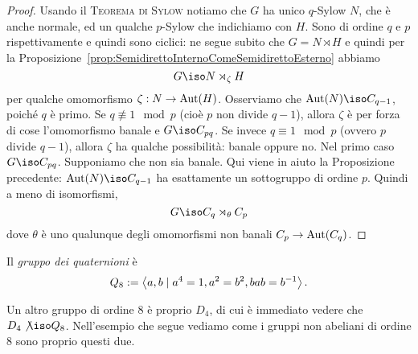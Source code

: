 \begin{proof}
Usando il {\scshape Teorema di Sylow} notiamo che $G$ ha unico $q$-Sylow $N$, che è anche normale, ed un qualche $p$-Sylow che indichiamo con $H$. Sono di ordine $q$ e $p$ rispettivamente e quindi sono ciclici: ne segue subito che $G = N \rtimes H$ e quindi per la Proposizione~\ref{prop:SemidirettoInternoComeSemidirettoEsterno} abbiamo 
\[G \iso N \rtimes_\zeta H \]
per qualche omomorfismo $\zeta : N \to \mathrm{Aut}(H)$. Osserviamo che $\Aut(N) \iso C_{q-1}$, poiché $q$ è primo. Se $q \nequiv 1 \mod p$ (cioè $p$ non divide $q-1$), allora $\zeta$ è per forza di cose l'omomorfismo banale e $G \iso C_{pq}$. Se invece $q \equiv 1 \mod p$ (ovvero $p$ divide $q-1$), allora $\zeta$ ha qualche possibilità: banale oppure no. Nel primo caso $G \iso C_{pq}$. Supponiamo che non sia banale. Qui viene in aiuto la Proposizione precedente: $\Aut(N) \iso C_{q-1}$ ha esattamente un sottogruppo di ordine $p$. Quindi a meno di isomorfismi,
\[G \iso C_q \rtimes_\theta C_p\]
dove $\theta$ è uno qualunque degli omomorfismi non banali $C_p \to \mathrm{Aut}(C_q)$.
\end{proof}



\begin{rich}[Gruppo $Q_8$]
Il {\em gruppo dei quaternioni} è
\[Q_8 := \left\langle a, b \mid a^4 = 1, a^2 = b^2, bab = b^{-1}\right\rangle .\]
\end{rich}

Un altro gruppo di ordine $8$ è proprio $D_4$, di cui è immediato vedere che $D_4 \not\iso Q_8$. Nell'esempio che segue vediamo come i gruppi non abeliani di ordine $8$ sono proprio questi due.

